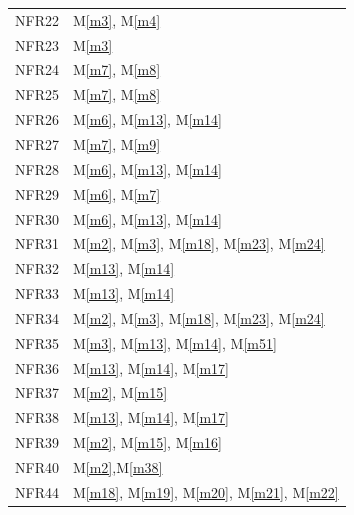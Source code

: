 \documentclass[12pt, titlepage]{article}
\newcommand{\mref}[1]{M\ref{#1}}
\begin{document}
\begin{longtable}{p{} p{}}
		NFR22 & \mref{m3}, \mref{m4} \\
		NFR23 & \mref{m3} \\
		\hline 
		\newpage
		\hline
		NFR24 & \mref{m7}, \mref{m8} \\
		NFR25 & \mref{m7}, \mref{m8} \\
		NFR26 & \mref{m6}, \mref{m13}, \mref{m14}\\
		NFR27 & \mref{m7}, \mref{m9}\\
		NFR28 & \mref{m6}, \mref{m13}, \mref{m14}\\
		NFR29 & \mref{m6}, \mref{m7}\\
		NFR30 & \mref{m6}, \mref{m13}, \mref{m14}\\
		NFR31 & \mref{m2}, \mref{m3}, \mref{m18}, \mref{m23}, \mref{m24} \\
		NFR32 & \mref{m13}, \mref{m14}\\
		NFR33 & \mref{m13}, \mref{m14}\\
		NFR34 & \mref{m2}, \mref{m3}, \mref{m18}, \mref{m23}, \mref{m24} \\
		NFR35 & \mref{m3}, \mref{m13}, \mref{m14}, \mref{m51} \\
		NFR36 & \mref{m13}, \mref{m14}, \mref{m17} \\
		NFR37 & \mref{m2}, \mref{m15} \\
		NFR38 & \mref{m13}, \mref{m14},  \mref{m17} \\
		NFR39 & \mref{m2}, \mref{m15}, \mref{m16} \\
		NFR40 & \mref{m2},\mref{m38} \\
		NFR44 & \mref{m18}, \mref{m19}, \mref{m20}, \mref{m21}, \mref{m22} \\
		\bottomrule
	\end{longtable}
\newpage
\end{document}
